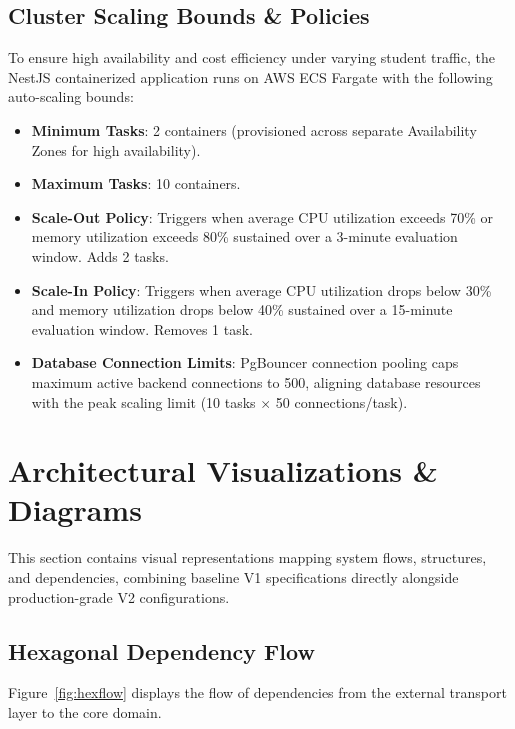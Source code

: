 \documentclass[11pt,a4paper]{report}
\begin{document}
\section{Cluster Scaling Bounds \& Policies}
To ensure high availability and cost efficiency under varying student traffic, the NestJS containerized application runs on AWS ECS Fargate with the following auto-scaling bounds:
\begin{itemize}
    \item \textbf{Minimum Tasks}: 2 containers (provisioned across separate Availability Zones for high availability).
    \item \textbf{Maximum Tasks}: 10 containers.
    \item \textbf{Scale-Out Policy}: Triggers when average CPU utilization exceeds 70\% or memory utilization exceeds 80\% sustained over a 3-minute evaluation window. Adds 2 tasks.
    \item \textbf{Scale-In Policy}: Triggers when average CPU utilization drops below 30\% and memory utilization drops below 40\% sustained over a 15-minute evaluation window. Removes 1 task.
    \item \textbf{Database Connection Limits}: PgBouncer connection pooling caps maximum active backend connections to 500, aligning database resources with the peak scaling limit (10 tasks $\times$ 50 connections/task).
\end{itemize}

\chapter{Architectural Visualizations \& Diagrams}


This section contains visual representations mapping system flows, structures, and dependencies, combining baseline V1 specifications directly alongside production-grade V2 configurations.

\section{Hexagonal Dependency Flow}
Figure~\ref{fig:hexflow} displays the flow of dependencies from the external transport layer to the core domain.
\end{document}
